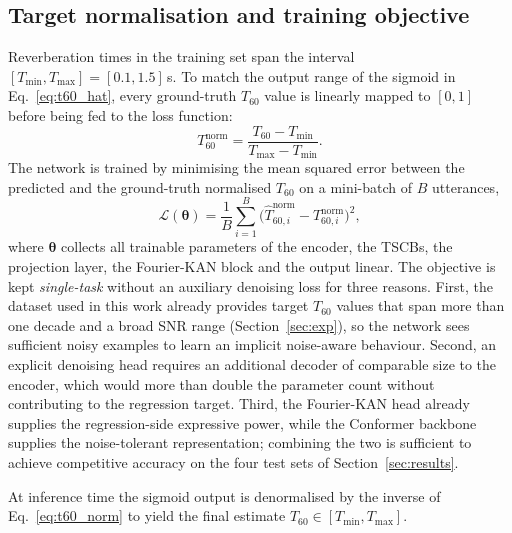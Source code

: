 \documentclass[a4paper,fleqn]{cas-sc}
\begin{document}
\subsection{Target normalisation and training objective}\label{sec:method:loss}

Reverberation times in the training set span the interval
$[T_{\min}, T_{\max}] = [0.1, 1.5]$\,s. To match the output range of the
sigmoid in Eq.~\eqref{eq:t60_hat}, every ground-truth $T_{60}$ value is
linearly mapped to $[0,1]$ before being fed to the loss function:
\begin{equation}\label{eq:t60_norm}
  T_{60}^{\mathrm{norm}}
  = \frac{T_{60} - T_{\min}}{T_{\max} - T_{\min}}.
\end{equation}
The network is trained by minimising the mean squared error between the
predicted and the ground-truth normalised $T_{60}$ on a mini-batch of
$B$ utterances,
\begin{equation}\label{eq:loss}
  \mathcal{L}(\boldsymbol{\theta})
  = \frac{1}{B}\sum_{i=1}^{B}\bigl(\hat{T}_{60,i}^{\mathrm{norm}}
                                  - T_{60,i}^{\mathrm{norm}}\bigr)^{2},
\end{equation}
where $\boldsymbol{\theta}$ collects all trainable parameters of the
encoder, the TSCBs, the projection layer, the Fourier-KAN block and the
output linear. The objective is kept \emph{single-task}
without an auxiliary denoising loss for three reasons. First, the
dataset used in this work already provides
target $T_{60}$ values that span more than one decade and a broad SNR
range (Section~\ref{sec:exp}), so the network sees sufficient noisy
examples to learn an implicit noise-aware behaviour. Second, an explicit
denoising head requires an additional decoder of comparable size to the
encoder, which would more than double the parameter count without
contributing to the regression target. Third, the Fourier-KAN head
already supplies the regression-side expressive power, while the
Conformer backbone supplies the noise-tolerant representation; combining
the two is sufficient to achieve competitive accuracy on the four test
sets of Section~\ref{sec:results}.

At inference time the sigmoid output is denormalised by the inverse of
Eq.~\eqref{eq:t60_norm} to yield the final estimate
$\hat{T}_{60}\in[T_{\min}, T_{\max}]$.




\end{document}
